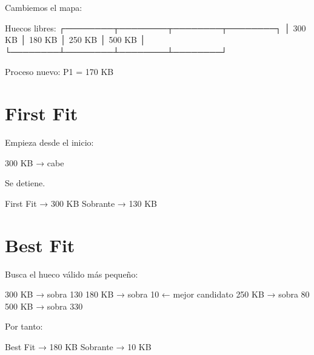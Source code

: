 \documentclass[
  spanish,
  letterpaper,
]{scrbook}
\newenvironment{Shaded}{\begin{snugshade}}{\end{snugshade}}
\newcommand{\NormalTok}[1]{\textcolor[rgb]{0.00,0.23,0.31}{#1}}
\begin{document}
Cambiemos el mapa:

\begin{Shaded}
\begin{Highlighting}[]
\NormalTok{Huecos libres:}
\NormalTok{┌────────┬────────┬────────┬────────┐}
\NormalTok{│ 300 KB │ 180 KB │ 250 KB │ 500 KB │}
\NormalTok{└────────┴────────┴────────┴────────┘}

\NormalTok{Proceso nuevo:}
\NormalTok{P1 = 170 KB}
\end{Highlighting}
\end{Shaded}

\section{First Fit}\label{first-fit-3}

Empieza desde el inicio:

\begin{Shaded}
\begin{Highlighting}[]
\NormalTok{300 KB → cabe}
\end{Highlighting}
\end{Shaded}

Se detiene.

\begin{Shaded}
\begin{Highlighting}[]
\NormalTok{First Fit → 300 KB}
\NormalTok{Sobrante  → 130 KB}
\end{Highlighting}
\end{Shaded}

\section{Best Fit}\label{best-fit-3}

Busca el hueco válido más pequeño:

\begin{Shaded}
\begin{Highlighting}[]
\NormalTok{300 KB → sobra 130}
\NormalTok{180 KB → sobra 10   ← mejor candidato}
\NormalTok{250 KB → sobra 80}
\NormalTok{500 KB → sobra 330}
\end{Highlighting}
\end{Shaded}

Por tanto:

\begin{Shaded}
\begin{Highlighting}[]
\NormalTok{Best Fit → 180 KB}
\NormalTok{Sobrante → 10 KB}
\end{Highlighting}
\end{Shaded}
\end{document}
